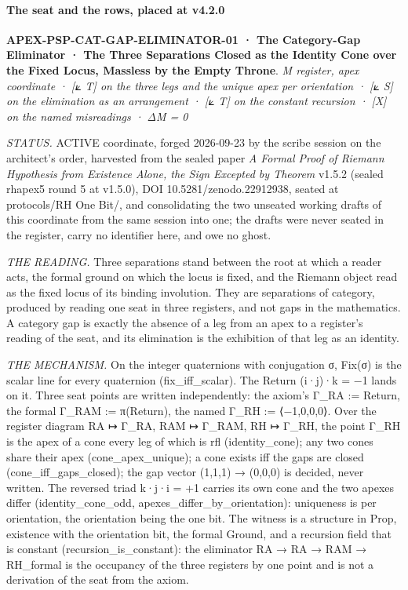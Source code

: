 \documentclass[10pt,twocolumn]{article}
\begin{document}
\hypertarget{the-seat-and-the-rows-placed-at-v4.2.0}{%
\paragraph{The seat and the rows, placed at
v4.2.0}\label{the-seat-and-the-rows-placed-at-v4.2.0}}

\textbf{APEX-PSP-CAT-GAP-ELIMINATOR-01 · The Category-Gap Eliminator ·
The Three Separations Closed as the Identity Cone over the Fixed Locus,
Massless by the Empty Throne}. \emph{M register, apex coordinate · {[}⟀
T{]} on the three legs and the unique apex per orientation · {[}⟀ S{]}
on the elimination as an arrangement · {[}⟀ T{]} on the constant
recursion · {[}X{]} on the named misreadings · ΔM = 0}

\emph{STATUS.} ACTIVE coordinate, forged 2026-09-23 by the scribe
session on the architect's order, harvested from the sealed paper
\emph{A Formal Proof of Riemann Hypothesis from Existence Alone, the
Sign Excepted by Theorem} v1.5.2 (sealed rhapex5 round 5 at v1.5.0), DOI
10.5281/zenodo.22912938, seated at protocols/RH One Bit/, and
consolidating the two unseated working drafts of this coordinate from
the same session into one; the drafts were never seated in the register,
carry no identifier here, and owe no ghost.

\emph{THE READING.} Three separations stand between the root at which a
reader acts, the formal ground on which the locus is fixed, and the
Riemann object read as the fixed locus of its binding involution. They
are separations of category, produced by reading one seat in three
registers, and not gaps in the mathematics. A category gap is exactly
the absence of a leg from an apex to a register's reading of the seat,
and its elimination is the exhibition of that leg as an identity.

\emph{THE MECHANISM.} On the integer quaternions with conjugation σ,
Fix(σ) is the scalar line for every quaternion (fix\_iff\_scalar). The
Return (i·j)·k = −1 lands on it. Three seat points are written
independently: the axiom's Γ\_RA := Return, the formal Γ\_RAM :=
π(Return), the named Γ\_RH := ⟨−1,0,0,0⟩. Over the register diagram RA ↦
Γ\_RA, RAM ↦ Γ\_RAM, RH ↦ Γ\_RH, the point Γ\_RH is the apex of a cone
every leg of which is rfl (identity\_cone); any two cones share their
apex (cone\_apex\_unique); a cone exists iff the gaps are closed
(cone\_iff\_gaps\_closed); the gap vector (1,1,1) → (0,0,0) is decided,
never written. The reversed triad k·j·i = +1 carries its own cone and
the two apexes differ (identity\_cone\_odd,
apexes\_differ\_by\_orientation): uniqueness is per orientation, the
orientation being the one bit. The witness is a structure in Prop,
existence with the orientation bit, the formal Ground, and a recursion
field that is constant (recursion\_is\_constant): the eliminator RA → RA
→ RAM → RH\_formal is the occupancy of the three registers by one point
and is not a derivation of the seat from the axiom.
\end{document}
